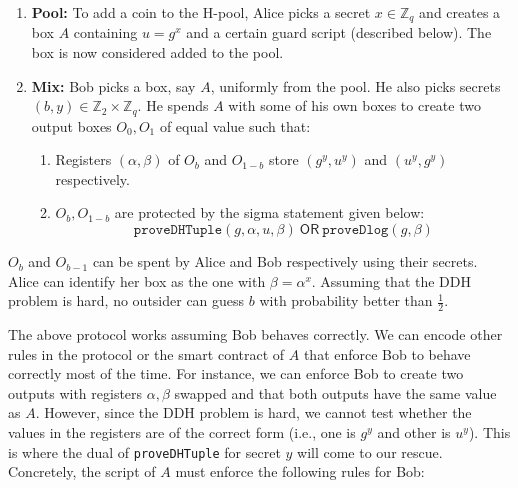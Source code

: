 \documentclass[runningheads]{llncs}
\newcommand{\ornode}{\ensuremath{\mathsf{OR}}}
\begin{document}
\begin{enumerate}
	\item \textbf{Pool:} To add a coin to the H-pool, Alice picks a secret $x\in \mathbb{Z}_q$ and creates a box $A$ containing $u = g^x$ and a certain guard script (described below). The box is now considered added to the pool. 
	\item \textbf{Mix:} Bob picks a box, say $A$, uniformly from the pool. He also picks secrets $(b, y) \in \mathbb{Z}_2\times \mathbb{Z}_q$. He spends $A$ with some of his own boxes to create two output boxes $O_0, O_1$ of equal value such that:
	\begin{enumerate}
		\item Registers $({\alpha}, {\beta})$ of $O_b$ and $O_{1-b}$ store $(g^y, u^y)$ and $(u^y, g^y)$ respectively. 
		\item $O_b, O_{1-b}$ are protected by the sigma statement given below:
    		\begin{equation}\label{fullScriptEqn}
    		    \texttt{proveDHTuple}(g, {\alpha}, u, {\beta})~\ornode~\texttt{proveDlog}(g, {\beta})
    		\end{equation}
	\end{enumerate}
\end{enumerate}

$O_b$ and $O_{b-1}$ can be spent by Alice and Bob respectively using their secrets. Alice can identify her box as the one with ${\beta} = {\alpha}^x$. 
Assuming that the DDH problem is hard, no outsider can guess $b$ with probability better than $\frac{1}{2}$. 

The above protocol works assuming Bob behaves correctly. 
We can encode other rules in the protocol or the smart contract of $A$ that enforce Bob to behave correctly most of the time.
For instance, we can enforce Bob to create two outputs with registers $\alpha, \beta$ swapped and that both outputs have the same value as $A$. However,
since the DDH problem is hard, we cannot test whether the values in the registers are of the correct form (i.e., one is $g^y$ and other is $u^y$).
This is where the dual of \texttt{proveDHTuple} for secret $y$ will come to our rescue. 
Concretely, the script of $A$ must enforce the following rules for Bob:
\end{document}
